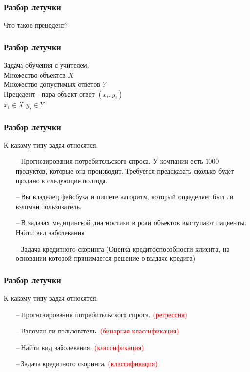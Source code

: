 \documentclass[12pt]{beamer}
\subtitle{Лекция 3. Методы кластеризации}
\begin{document}
\frame{\titlepage}


\begin{frame}\frametitle{Разбор летучки}
	Что такое прецедент?
\end{frame}

\begin{frame}\frametitle{Разбор летучки}
	Задача обучения с учителем.\\
	\vspace{5mm}
	Множество объектов $X$ \\
	Множество допустимых ответов $Y$\\
	Прецедент - пара объект-ответ ${(x_i,y_i)}$  \\
	$x_i \in X$ 	$y_i \in Y$
\end{frame}

\begin{frame}\frametitle{Разбор летучки}
	К какому типу задач относятся:
	\begin{itemize}
		\item[--] Прогнозирования потребительского спроса. У компании есть 1000 продуктов, которые она производит. Требуется предсказать сколько будет продано в следующие полгода.
		\item[--] Вы владелец фейсбука и пишете алгоритм, который определяет был ли взломан пользователь. 
		\item[--] В задачах медицинской диагностики в роли объектов выступают пациенты. Найти вид заболевания.
		\item[--] Задача кредитного скоринга (Оценка кредитоспособности клиента, на основании которой принимается решение о выдаче кредита)
	\end{itemize}
\end{frame}

\begin{frame}\frametitle{Разбор летучки}
	К какому типу задач относятся:
	\begin{itemize}
		\item[--] Прогнозирования потребительского спроса. 
\textcolor{red}{(регрессия)}
		\item[--] Взломан ли пользователь. \textcolor{red}{(бинарная классификация)}
		\item[--] Найти вид заболевания. \textcolor{red}{(классификация)}
		\item[--] Задача кредитного скоринга.  \textcolor{red}{(классификация)}
	\end{itemize}
\end{frame}
\end{document}
